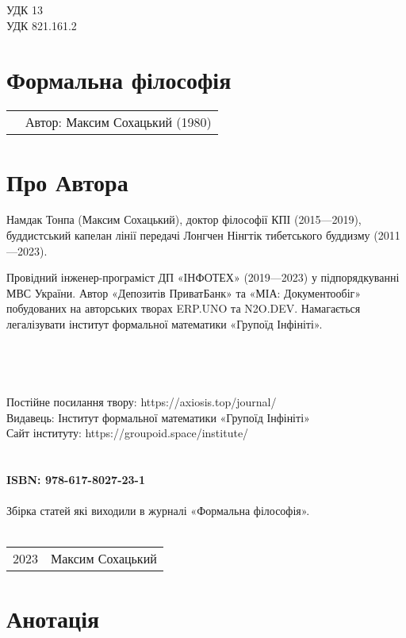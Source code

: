 \noindent УДК 13\\
УДК 821.161.2

\section*{Формальна філософія}

\begin{tabular}{ll}
& Автор: Максим Сохацький (1980)\\
\end{tabular}

\section*{Про Автора}
Намдак Тонпа (Максим Сохацький), доктор філософії КПІ (2015---2019),
буддистський капелан лінії передачі Лонгчен Нінгтік тибетського
буддизму (2011---2023).

Провідний інженер-програміст ДП «ІНФОТЕХ» (2019---2023)
у підпорядкуванні МВС України. Автор «Депозитів ПриватБанк»
та «МІА: Документообіг» побудованих на авторських творах ERP.UNO
та N2O.DEV. Намагається легалізувати інститут формальної
математики «Групоїд Інфініті».
\\
\\
\\
\\
\\
Постійне посилання твору: https://axiosis.top/journal/ \\
Видавець: Інститут формальної математики «Групоїд Інфініті» \\
Сайт інституту: https://groupoid.space/institute/ \\
\\
\\
{\bf ISBN: 978-617-8027-23-1 \hspace{2em}}
\\
\\
\small
\indent Збірка статей які виходили в журналі «Формальна філософія».
\\
\\
\begin{tabular}{ll}
\textcopyright{} 2023 & Максим Сохацький
\end{tabular}

\newpage
\section*{Анотація}

\normalsize
